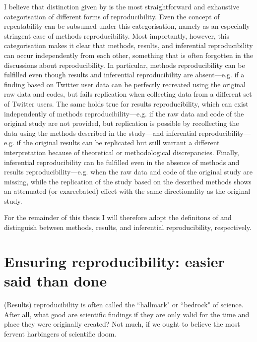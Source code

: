 \documentclass[11pt, a4paper,twoside]{report}\usepackage[]{graphicx}\usepackage[]{color}
\begin{document}
I believe that distinction given by \cite{goodman_what_2016} is the most straightforward and exhaustive categorisation of different forms of reproducibility. Even the concept of repeatability can be subsumed under this categorisation, namely as an especially stringent case of methods reproducibility. Most importantly, however, this categorisation makes it clear that methods, results, and inferential reproducibility can occur independently from each other, something that is often forgotten in the discussions about reproducibility. In particular, methods reproducibility can be fulfilled even though results and inferential reproducibility are absent---e.g. if a finding based on Twitter user data can be perfectly recreated using the original raw data and codes, but fails replication when collecting data from a different set of Twitter users. The same holds true for results reproducibility, which can exist independently of methods reproducibility---e.g. if the raw data and code of the original study are not provided, but replication is possible by recollecting the data using the methods described in the study---and inferential reproducibility---e.g. if the original results can be replicated but still warrant a different interpretation because of theoretical or methodological discrepancies. Finally, inferential reproducibility can be fulfilled even in the absence of methods and results reproducibility---e.g. when the raw data and code of the original study are missing, while the replication of the study based on the described methods shows an attenuated (or exarcebated) effect with the same directionality as the original study.

For the remainder of this thesis I will therefore adopt the definitons of \cite{goodman_what_2016} and distinguish between methods, results, and inferential reproducibility, respectively.

\section{Ensuring reproducibility: easier said than done}
(Results) reproducibility is often called the ``hallmark" \citep{aarts2015estimating,munafo_manifesto_2017} or ``bedrock" \citep{casadevall_reproducible_2010} of science. After all, what good are scientific findings if they are only valid for the time and place they were originally created? Not much, if we ought to believe the most fervent harbingers of scientific doom.
\end{document}
